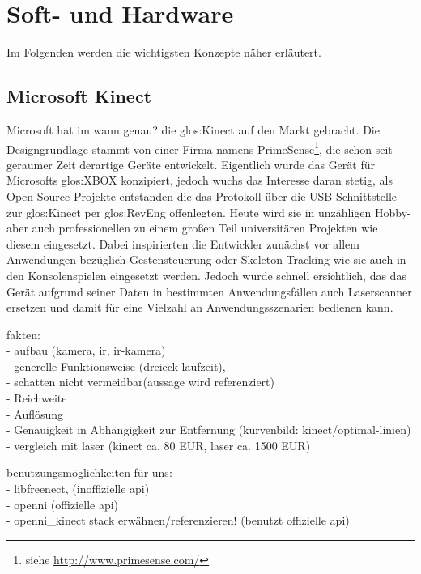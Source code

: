 \section{Soft- und Hardware}
\label{sec:softundhardware}

Im Folgenden werden die wichtigsten Konzepte näher erläutert.

\subsection{Microsoft Kinect}
\label{subsec:kinect}

Microsoft hat im {\color{red} wann genau?} die \gls{glos:Kinect} auf den Markt gebracht. Die Designgrundlage stammt von einer Firma namens PrimeSense\footnote{siehe \url{http://www.primesense.com/}}, die schon seit geraumer Zeit derartige Geräte entwickelt. Eigentlich wurde das Gerät für Microsofts \gls{glos:XBOX} konzipiert, jedoch wuchs das Interesse daran stetig, als Open Source Projekte entstanden die das Protokoll über die USB-Schnittstelle zur \gls{glos:Kinect} per \gls{glos:RevEng} offenlegten. Heute wird sie in unzähligen Hobby- aber auch professionellen zu einem großen Teil universitären Projekten wie diesem eingesetzt. Dabei inspirierten die Entwickler zunächst vor allem Anwendungen bezüglich Gestensteuerung oder Skeleton Tracking wie sie auch in den Konsolenspielen eingesetzt werden. Jedoch wurde schnell ersichtlich, das das Gerät aufgrund seiner Daten in bestimmten Anwendungsfällen auch Laserscanner ersetzen und damit für eine Vielzahl an Anwendungsszenarien bedienen kann.

{\color{red}
fakten:\\
- aufbau (kamera, ir, ir-kamera)\\
- generelle Funktionsweise (dreieck-laufzeit), \\
- schatten nicht vermeidbar(aussage wird referenziert)\\
- Reichweite\\
- Auflösung\\
- Genauigkeit in Abhängigkeit zur Entfernung (kurvenbild: kinect/optimal-linien)\\
- vergleich mit laser (kinect ca. 80 EUR, laser ca. 1500 EUR)\\
}

{\color{red}
benutzungsmöglichkeiten für uns:\\
- libfreenect, (inoffizielle api)\\
- openni (offizielle api)\\
- openni\_kinect stack erwähnen/referenzieren! (benutzt offizielle api)\\
}

